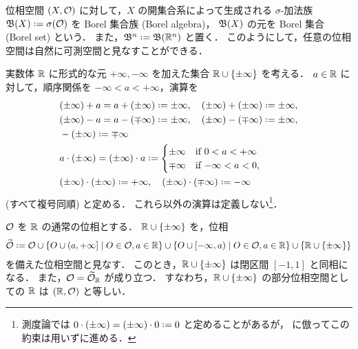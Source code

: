 \begin{example}\label{ex:Borel_algebra}
    位相空間 $(X,\mathcal{O})$ に対して，$X$ の開集合系によって生成される $\sigma$-加法族
    $\Bfrak(X)\defeq\sigma(\Ocal)$ を Borel 集合族 (Borel algebra)，
    $\mathfrak{B}(X)$ の元を Borel 集合 (Borel set) という．
    また，$\Bfrak^n\defeq\Bfrak(\Rbb^n)$ と置く．
    このようにして，任意の位相空間は自然に可測空間と見なすことができる．
\end{example}

\begin{example}\label{ex:extended_real}
    実数体 $\mathbb{R}$ に形式的な元 $+\infty,-\infty$ を加えた集合 $\mathbb{R}\cup\{\pm\infty\}$ を考える．
    $a\in\mathbb{R}$ に対して，順序関係を $-\infty<a<+\infty$，演算を
    \begin{align*}
        &(\pm\infty)+a=a+(\pm\infty)\defeq\pm\infty,\quad
        (\pm\infty)+(\pm\infty)\defeq\pm\infty,\\
        &(\pm\infty)-a=a-(\mp\infty)\defeq\pm\infty,\quad
        (\pm\infty)-(\mp\infty)\defeq\pm\infty,\\
        &-(\pm\infty)\defeq\mp\infty\\
        &a\cdot(\pm\infty)=(\pm\infty)\cdot a\defeq\begin{cases}
            \pm\infty&\text{if $0<a<+\infty$}\\
            \mp\infty&\text{if $-\infty<a<0$},
        \end{cases}\\
        &(\pm\infty)\cdot(\pm\infty)\defeq+\infty,\quad
        (\pm\infty)\cdot(\mp\infty)\defeq-\infty
    \end{align*}
    (すべて複号同順) と定める．
    これら以外の演算は定義しない\footnote{測度論では $0\cdot(\pm\infty)=(\pm\infty)\cdot0\defeq0$ と定めることがあるが，\cite[p.12]{It63} に倣ってこの約束は用いずに進める．}．

    $\mathcal{O}$ を $\mathbb{R}$ の通常の位相とする．
    $\mathbb{R}\cup\{\pm\infty\}$ を，位相
    \begin{align}
        \widetilde\Ocal\defeq\Ocal\cup\{O\cup(a,+\infty]\mid O\in\Ocal, a\in\Rbb\}\cup\{O\cup[-\infty,a)\mid O\in\Ocal, a\in\Rbb\}\cup\{\Rbb\cup\{\pm\infty\}\}
        \label{eqn:extended_real_topology}
    \end{align}
    を備えた位相空間と見なす．
    このとき，$\mathbb{R}\cup\{\pm\infty\}$ は閉区間 $[-1,1]$ と同相になる．
    また，$\mathcal{O}=\widetilde{\mathcal{O}}_{\mathbb{R}}$ が成り立つ．
    すなわち，$\mathbb{R}\cup\{\pm\infty\}$ の部分位相空間としての $\mathbb{R}$ は $(\mathbb{R},\mathcal{O})$ と等しい．


\end{example}
